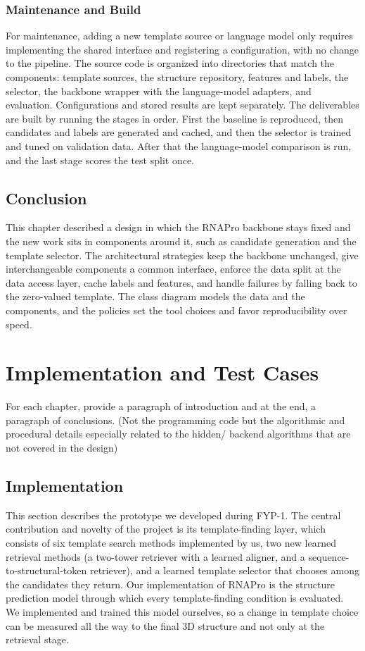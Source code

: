\documentclass{FastFyp}
\begin{document}
\subsection{Maintenance and Build}
For maintenance, adding a new template source or language model only requires implementing the shared interface and registering a configuration, with no change to the pipeline. The source code is organized into directories that match the components: template sources, the structure repository, features and labels, the selector, the backbone wrapper with the language-model adapters, and evaluation. Configurations and stored results are kept separately. The deliverables are built by running the stages in order. First the baseline is reproduced, then candidates and labels are generated and cached, and then the selector is trained and tuned on validation data. After that the language-model comparison is run, and the last stage scores the test split once.

\section{Conclusion}
This chapter described a design in which the RNAPro backbone stays fixed and the new work sits in components around it, such as candidate generation and the template selector. The architectural strategies keep the backbone unchanged, give interchangeable components a common interface, enforce the data split at the data access layer, cache labels and features, and handle failures by falling back to the zero-valued template. The class diagram models the data and the components, and the policies set the tool choices and favor reproducibility over speed.

\clearpage


\chapter{Implementation and Test Cases}
\label{ch:impl}
For each chapter, provide a paragraph of introduction and at the end, a paragraph of conclusions. (Not the programming code but the algorithmic and procedural details especially related to the hidden/ backend algorithms that are not covered in the design)
\section{Implementation}
\label{sec:impl}
This section describes the prototype we developed during FYP-1. The central contribution and novelty of the project is its template-finding layer, which consists of six template search methods implemented by us, two new learned retrieval methods (a two-tower retriever with a learned aligner, and a sequence-to-structural-token retriever), and a learned template selector that chooses among the candidates they return. Our implementation of RNAPro \cite{leerna} is the structure prediction model through which every template-finding condition is evaluated. We implemented and trained this model ourselves, so a change in template choice can be measured all the way to the final 3D structure and not only at the retrieval stage.
\end{document}
